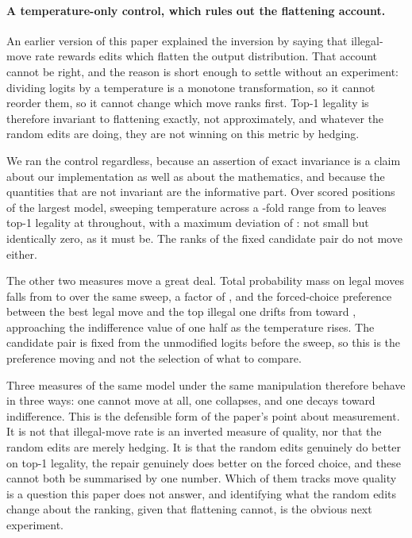 \documentclass[11pt]{article}
\begin{document}

\paragraph{A temperature-only control, which rules out the flattening account.}
An earlier version of this paper explained the inversion by saying that illegal-move
rate rewards edits which flatten the output distribution. That account cannot be
right, and the reason is short enough to settle without an experiment: dividing
logits by a temperature is a monotone transformation, so it cannot reorder them, so it
cannot change which move ranks first. Top-1 legality is therefore invariant to
flattening exactly, not approximately, and whatever the random edits are doing, they
are not winning on this metric by hedging.

We ran the control regardless, because an assertion of exact invariance is a claim
about our implementation as well as about the mathematics, and because the quantities
that are not invariant are the informative part. Over  scored positions
of the largest model, sweeping temperature across a -fold range from
 to  leaves top-1 legality at  throughout, with a maximum
deviation of : not small but identically zero, as it must be. The ranks of
the fixed candidate pair do not move either.

The other two measures move a great deal. Total probability mass on legal moves falls
from  to  over the same sweep, a factor of , and the
forced-choice preference between the best legal move and the top illegal one drifts
from  toward , approaching the indifference value of one half as
the temperature rises. The candidate pair is fixed from the unmodified logits before
the sweep, so this is the preference moving and not the selection of what to compare.

Three measures of the same model under the same manipulation therefore behave in three
ways: one cannot move at all, one collapses, and one decays toward indifference. This
is the defensible form of the paper's point about measurement. It is not that
illegal-move rate is an inverted measure of quality, nor that the random edits are
merely hedging. It is that the random edits genuinely do better on top-1 legality,
the repair genuinely does better on the forced choice, and these cannot both be
summarised by one number. Which of them tracks move quality is a question this paper
does not answer, and identifying what the random edits change about the ranking, given
that flattening cannot, is the obvious next experiment.
\end{document}
